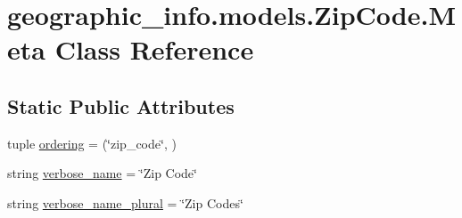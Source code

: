 \hypertarget{classgeographic__info_1_1models_1_1_zip_code_1_1_meta}{\section{geographic\-\_\-info.\-models.\-Zip\-Code.\-Meta Class Reference}
\label{classgeographic__info_1_1models_1_1_zip_code_1_1_meta}
}
\subsection*{Static Public Attributes}
\begin{DoxyCompactItemize}
\item 
tuple \hyperlink{classgeographic__info_1_1models_1_1_zip_code_1_1_meta_a7d25c0c820e382a4cc8e4692b5ef2421}{ordering} = (\char`\"{}zip\-\_\-code\char`\"{}, )
\item 
string \hyperlink{classgeographic__info_1_1models_1_1_zip_code_1_1_meta_a675a980f939680d8b9f0587d3e533c62}{verbose\-\_\-name} = \char`\"{}Zip Code\char`\"{}
\item 
string \hyperlink{classgeographic__info_1_1models_1_1_zip_code_1_1_meta_a0c399ce4ccb77690767e8f4386f91580}{verbose\-\_\-name\-\_\-plural} = \char`\"{}Zip Codes\char`\"{}
\end{DoxyCompactItemize}


